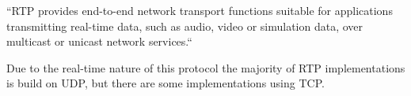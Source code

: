 ``RTP provides end-to-end network transport functions suitable for applications transmitting real-time data, such as audio, video or simulation data, over multicast or unicast network services.``\cite{RFC3550}

Due to the real-time nature of this protocol the majority of RTP implementations is build on UDP, but there are some implementations using TCP.







